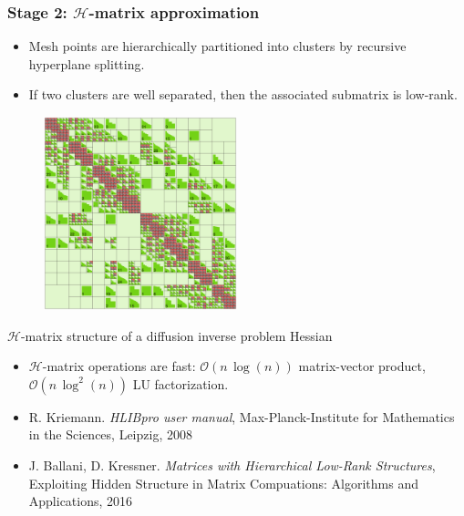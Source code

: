 \documentclass[10pt,final,xcolor=dvipsnames]{beamer}
\begin{document}
\begin{frame}
	\frametitle{Stage 2: $\mathcal{H}$-matrix approximation}
	
	\begin{minipage}{0.49\textwidth} 
		\begin{itemize}
			\item Mesh points are 
			hierarchically partitioned into
			clusters by recursive hyperplane splitting.
			\item If two clusters are well separated, then the associated
			submatrix is low-rank.
		\end{itemize}
	\end{minipage}
	\begin{minipage}{0.49\textwidth}
		\begin{figure}[htb]
			\centering\includegraphics[width=0.5\textwidth]
			{heat_inverse_problem_Hfull_hmatrix.eps}
		\end{figure}
		\begin{center}
			{\tiny $\mathcal{H}$-matrix structure of a diffusion
				inverse problem Hessian \\}
		\end{center}
	\end{minipage}
	
	\begin{itemize}
		\item 
		$\mathcal{H}$-matrix operations are fast: $\mathcal{O}\left(n\,\log\left(n\right)\right)$
		matrix-vector product, $\mathcal{O}\left(n\,\log^{2}\left(n\right)\right)$
		LU factorization.
	\end{itemize}
	
	\scriptsize{
		\begin{itemize}
			\item[]  R. Kriemann.
			{\em HLIBpro user manual}, Max-Planck-Institute
			for Mathematics in the Sciences, Leipzig, 2008
			\item[]   J. Ballani, D. Kressner.
			{\em Matrices with Hierarchical Low-Rank Structures},
			Exploiting Hidden Structure in Matrix Compuations:
			Algorithms and Applications, 2016
		\end{itemize}
	}
	
\end{frame}
\end{document}
